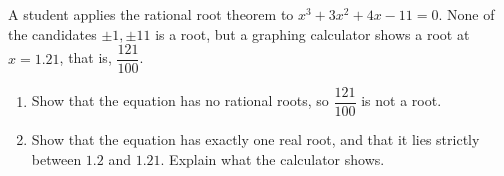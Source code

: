 A student applies the rational root theorem to $x^3+3x^2+4x-11=0$. None of the candidates $\pm1,\pm11$ is a root, but a graphing calculator shows a root at $x=1.21$, that is, $\dfrac{121}{100}$.
\begin{enumerate}
\item[(a)] Show that the equation has no rational roots, so $\dfrac{121}{100}$ is not a root.
\item[(b)] Show that the equation has exactly one real root, and that it lies strictly between $1.2$ and $1.21$. Explain what the calculator shows.
\end{enumerate}
